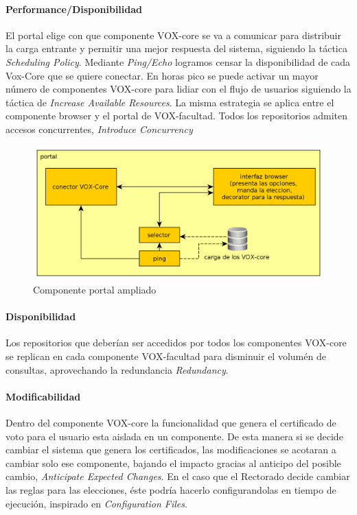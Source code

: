 \paragraph{Performance/Disponibilidad}
El portal elige con que componente VOX-core se va a comunicar para distribuir la carga entrante y permitir una mejor respuesta del sistema, siguiendo la táctica \textit{Scheduling Policy}. Mediante \textit{Ping/Echo} logramos censar la disponibilidad de cada Vox-Core que se quiere conectar. En horas pico se puede activar un mayor número de componentes VOX-core para lidiar con el flujo de usuarios siguiendo la táctica de \textit{Increase Available Resources}. La misma estrategia se aplica entre el componente browser y el portal de VOX-facultad.
Todos los repositorios admiten accesos concurrentes, \textit{Introduce Concurrency}
\begin{figure}[H]
	\begin{center}
		\includegraphics[scale=0.22]{../diagramas/portal.png}
		\caption{Componente portal ampliado}
	\end{center} 
\end{figure}

\paragraph{Disponibilidad}
Los repositorios que deberían ser accedidos por todos los componentes VOX-core se replican en cada componente VOX-facultad para disminuir el volumén de consultas, aprovechando la redundancia \textit{Redundancy}.

\paragraph{Modificabilidad}
Dentro del componente VOX-core la funcionalidad que genera el certificado de voto para el usuario esta aislada en un componente. De esta manera si se decide cambiar el sistema que genera los certificados, las modificaciones se acotaran a cambiar solo ese componente, bajando el impacto gracias al anticipo del posible cambio, \textit{Anticipate Expected Changes}. En el caso que el Rectorado decide cambiar las reglas para las elecciones, éste podría hacerlo configurandolas en tiempo de ejecución, inspirado en \textit{Configuration Files}.


